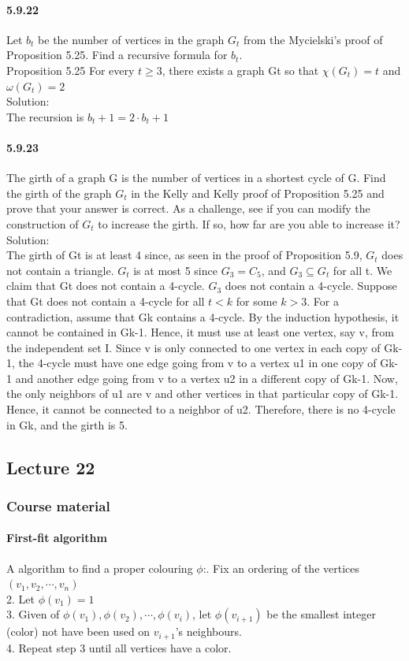 \documentclass{article}
\begin{document}
\paragraph{5.9.22}
Let $b_t$ be the number of vertices in the graph $G_t$ from the Mycielski’s proof of Proposition 5.25. Find a recursive formula for $b_t$.\\
Proposition 5.25 For every $t \ge 3$, there exists a graph Gt so that $\chi(G_t) = t$ and $\omega(G_t) = 2$\\
Solution:\\
The recursion is $b_t+1 = 2\cdot b_t + 1$
\paragraph{5.9.23}
The girth of a graph G is the number of vertices in a shortest cycle of G. Find the girth of the graph $G_t$ in the Kelly and Kelly proof of Proposition 5.25 and prove that your answer is correct. As a challenge, see if you can modify the construction of $G_t$ to increase the girth. If so, how far are you able to increase it?\\
Solution:\\
The girth of Gt
is at least 4 since, as seen in the proof of Proposition 5.9, $G_t$ does not contain a triangle. $G_t$ is at most 5 since $G_3 = C_5$, and $G_3 \subseteq G_t$ for all t. We claim that Gt does not contain a 4-cycle. $G_3$ does not contain a 4-cycle. Suppose that Gt does not contain a 4-cycle for all $t < k$ for some $k > 3$. For a contradiction, assume that Gk contains a 4-cycle. By the induction hypothesis, it cannot be contained in Gk-1. Hence, it must use at least one vertex, say v, from the independent set I. Since v is only connected to one vertex in each copy of Gk-1, the 4-cycle must have one edge going from v to a vertex u1 in one copy of Gk-1 and another edge going from v to a vertex u2 in a different copy of Gk-1. Now, the only neighbors of u1 are v and other vertices in that particular copy of Gk-1. Hence, it cannot be connected to a neighbor of u2. Therefore, there is no 4-cycle in Gk, and the girth is 5.
\subsection{Lecture 22}
\subsubsection{Course material}
\paragraph{First-fit algorithm} A algorithm to find a proper colouring $\phi$:. Fix an ordering of the vertices $(v_1,v_2,\cdots,v_n)$\\
2. Let $\phi(v_1)=1$\\
3. Given of $\phi (v_1),\phi (v_2),\cdots, \phi(v_i)$, let $\phi (v_{i+1})$ be the smallest integer (color) not have been used on $v_{i+1}$'s neighbours.\\
4. Repeat step 3 until all vertices have a color.\newline
\end{document}
